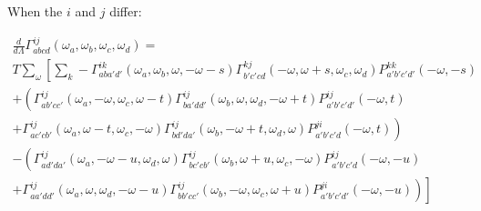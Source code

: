 \documentclass{article}
\begin{document}
When the $i$ and $j$ differ:


\begin{equation}
  \begin{aligned}
  \frac{d}{d\Lambda} \Gamma^{ij}_{abcd}(\omega_a,\omega_b,\omega_c,\omega_d) = \\
  T \sum_\omega \left[ \sum_k -\Gamma^{ik}_{aba'd'}(\omega_a,\omega_b,\omega,-\omega-s)
    \Gamma^{kj}_{b'c'cd}(-\omega,\omega+s,\omega_c,\omega_d)
    P^{kk}_{a'b'c'd'}(-\omega,-s) \right. \\
    + \left( \Gamma^{ij}_{ab'cc'}(\omega_a,-\omega,\omega_c,\omega-t)
    \Gamma^{ij}_{ba'dd'}(\omega_b,\omega,\omega_d,-\omega+t)
    P^{ij}_{a'b'c'd'}(-\omega,t) \right. \\
   \left. + \Gamma^{ij}_{ac'cb'}(\omega_a,\omega-t,\omega_c,-\omega)
   \Gamma^{ij}_{bd'da'}(\omega_b,-\omega+t,\omega_d,\omega)P^{ji}_{a'b'c'd}(-\omega,t) \right) \\
   - \left(\Gamma^{ij}_{ad'da'}(\omega_a,-\omega-u,\omega_d,\omega)
   \Gamma^{ij}_{bc'cb'}(\omega_b,\omega+u,\omega_c,-\omega)
   P^{ij}_{a'b'c'd}(-\omega,-u) \right. \\
   + \left.\left. \Gamma^{ij}_{aa'dd'}(\omega_a,\omega,\omega_d,-\omega-u)
   \Gamma^{ij}_{bb'cc'}(\omega_b,-\omega,\omega_c,\omega+u)
   P^{ji}_{a'b'c'd'}(-\omega,-u) \right)\right] \\
  \end{aligned}
\end{equation}
\end{document}
